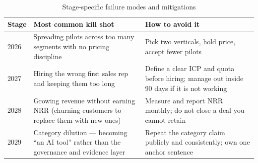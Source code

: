 \begin{table}[H]
\centering
\renewcommand{\arraystretch}{1.5}
\begin{tabularx}{\textwidth}{@{}lXX@{}}
\toprule
\textbf{Stage} & \textbf{Most common kill shot} & \textbf{How to avoid it} \\
\midrule
2026 & Spreading pilots across too many segments with no pricing discipline & Pick two verticals, hold price, accept fewer pilots \\
2027 & Hiring the wrong first sales rep and keeping them too long & Define a clear ICP and quota before hiring; manage out inside 90 days if it is not working \\
2028 & Growing revenue without earning NRR (churning customers to replace them with new ones) & Measure and report NRR monthly; do not close a deal you cannot retain \\
2029 & Category dilution — becoming ``an AI tool'' rather than the governance and evidence layer & Repeat the category claim publicly and consistently; own one anchor sentence \\
\bottomrule
\end{tabularx}
\caption{Stage-specific failure modes and mitigations}
\end{table}
